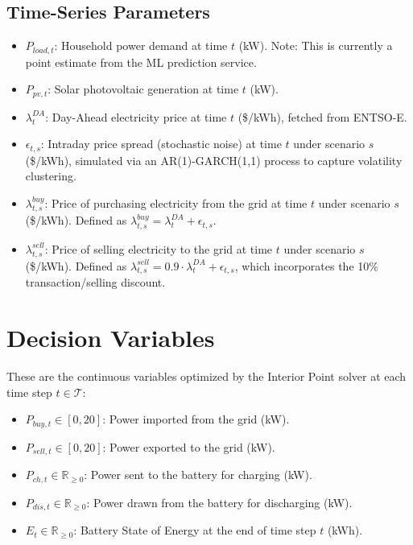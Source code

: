 \documentclass[12pt, a4paper]{article}
\begin{document}
\subsection{Time-Series Parameters}
\begin{itemize}
    \item $P_{load,t}$: Household power demand at time $t$ (kW). Note: This is currently a point estimate from the ML prediction service.
    \item $P_{pv,t}$: Solar photovoltaic generation at time $t$ (kW).
    \item $\lambda^{DA}_t$: Day-Ahead electricity price at time $t$ (\$/kWh), fetched from ENTSO-E.
    \item $\epsilon_{t,s}$: Intraday price spread (stochastic noise) at time $t$ under scenario $s$ (\$/kWh), simulated via an AR(1)-GARCH(1,1) process to capture volatility clustering.
    \item $\lambda^{buy}_{t,s}$: Price of purchasing electricity from the grid at time $t$ under scenario $s$ (\$/kWh). Defined as $\lambda^{buy}_{t,s} = \lambda^{DA}_t + \epsilon_{t,s}$.
    \item $\lambda^{sell}_{t,s}$: Price of selling electricity to the grid at time $t$ under scenario $s$ (\$/kWh). Defined as $\lambda^{sell}_{t,s} = 0.9 \cdot \lambda^{DA}_t + \epsilon_{t,s}$, which incorporates the 10\% transaction/selling discount.
\end{itemize}

\section{Decision Variables}
These are the continuous variables optimized by the Interior Point solver at each time step $t \in \mathcal{T}$:
\begin{itemize}
    \item $P_{buy,t} \in [0, 20]$: Power imported from the grid (kW).
    \item $P_{sell,t} \in [0, 20]$: Power exported to the grid (kW).
    \item $P_{ch,t} \in \mathbb{R}_{\ge 0}$: Power sent to the battery for charging (kW).
    \item $P_{dis,t} \in \mathbb{R}_{\ge 0}$: Power drawn from the battery for discharging (kW).
    \item $E_t \in \mathbb{R}_{\ge 0}$: Battery State of Energy at the end of time step $t$ (kWh).
\end{itemize}
\end{document}
